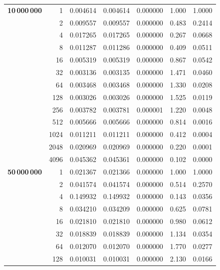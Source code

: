 \documentclass[a4paper,11pt]{article}
\begin{document}
\begin{center}
\begin{longtable}{crccccc}
    \textbf{10\,000\,000} & 1    & 0.004614 & 0.004614 & 0.000000 & 1.000  & 1.0000 \\
                       & 2    & 0.009557 & 0.009557 & 0.000000 & 0.483  & 0.2414 \\
                       & 4    & 0.017265 & 0.017265 & 0.000000 & 0.267  & 0.0668 \\
                       & 8    & 0.011287 & 0.011286 & 0.000000 & 0.409  & 0.0511 \\
                       & 16   & 0.005319 & 0.005319 & 0.000000 & 0.867  & 0.0542 \\
                       & 32   & 0.003136 & 0.003135 & 0.000000 & 1.471  & 0.0460 \\
                       & 64   & 0.003468 & 0.003468 & 0.000000 & 1.330  & 0.0208 \\
                       & 128  & 0.003026 & 0.003026 & 0.000000 & 1.525  & 0.0119 \\
                       & 256  & 0.003782 & 0.003781 & 0.000001 & 1.220  & 0.0048 \\
                       & 512  & 0.005666 & 0.005666 & 0.000000 & 0.814  & 0.0016 \\
                       & 1024 & 0.011211 & 0.011211 & 0.000000 & 0.412  & 0.0004 \\
                       & 2048 & 0.020969 & 0.020969 & 0.000000 & 0.220  & 0.0001 \\
                       & 4096 & 0.045362 & 0.045361 & 0.000000 & 0.102  & 0.0000 \\
    \midrule
    \textbf{50\,000\,000} & 1    & 0.021367 & 0.021366 & 0.000000 & 1.000  & 1.0000 \\
                       & 2    & 0.041574 & 0.041574 & 0.000000 & 0.514  & 0.2570 \\
                       & 4    & 0.149932 & 0.149932 & 0.000000 & 0.143  & 0.0356 \\
                       & 8    & 0.034210 & 0.034209 & 0.000000 & 0.625  & 0.0781 \\
                       & 16   & 0.021810 & 0.021810 & 0.000000 & 0.980  & 0.0612 \\
                       & 32   & 0.018839 & 0.018839 & 0.000000 & 1.134  & 0.0354 \\
                       & 64   & 0.012070 & 0.012070 & 0.000000 & 1.770  & 0.0277 \\
                       & 128  & 0.010031 & 0.010031 & 0.000000 & 2.130  & 0.0166 \\

\end{longtable}
\end{center}
\end{document}
